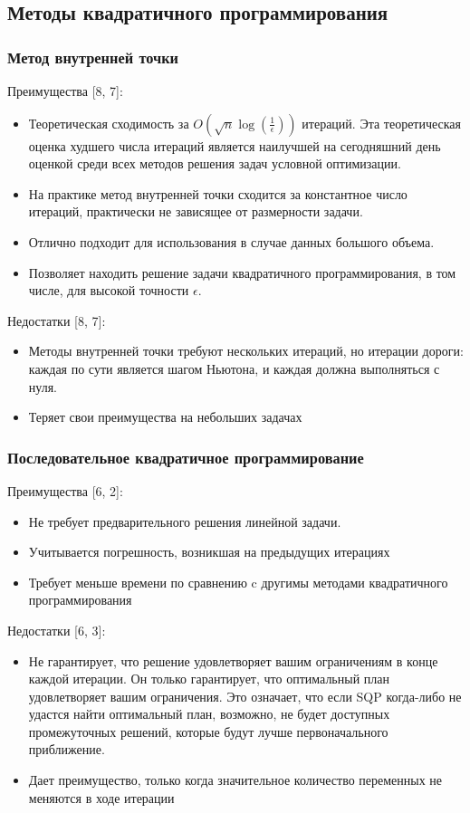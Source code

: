 \documentclass[12pt,a4paper]{article}
\begin{document}
	\subsection{Методы квадратичного программирования}
	\subsubsection{Метод внутренней точки}
	Преимущества [8, 7]:
	\begin{itemize}
		\item Теоретическая сходимость за \textbf{$O(\sqrt{n}\log(\frac{1}{\epsilon}))$}
		итераций. Эта теоретическая оценка худшего числа итераций является наилучшей на сегодняшний день оценкой
		среди всех методов решения задач условной оптимизации.
		\item На практике метод внутренней точки сходится за
		константное число итераций, практически не зависящее от размерности задачи. 
		\item Отлично подходит для использования в случае данных большого объема.
		\item Позволяет находить решение задачи квадратичного программирования, в том числе, для высокой точности $\epsilon$.
	\end{itemize}
	
	Недостатки [8, 7]:
	\begin{itemize}
		\item Методы внутренней точки требуют нескольких итераций, но итерации дороги: каждая по сути является шагом Ньютона, и каждая должна выполняться с нуля. 
		\item Теряет свои преимущества на небольших задачах 
	\end{itemize}
	
	\subsubsection{Последовательное квадратичное программирование}
	Преимущества [6, 2]:
	\begin{itemize}
		\item Не требует предварительного решения линейной задачи.
		\item Учитывается погрешность, возникшая на предыдущих
		итерациях
		\item Требует меньше времени по сравнению c другимы методами квадратичного программирования
	\end{itemize}
	
	
	Недостатки [6, 3]:
	\begin{itemize}
		\item Не гарантирует, что решение удовлетворяет вашим ограничениям в конце каждой итерации. Он только гарантирует, что оптимальный план удовлетворяет вашим ограничения. Это означает, что если SQP когда-либо не удастся найти оптимальный план, возможно, не будет доступных промежуточных решений, которые будут лучше первоначального приближение.
		\item Дает преимущество, только когда значительное количество
		переменных не меняются в ходе итерации
	\end{itemize}
	
\end{document}
